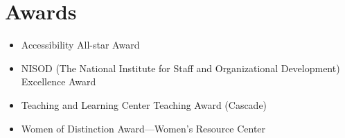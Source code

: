 \section*{Awards}

\begin{itemize}
\item Accessibility All-star Award
\item NISOD (The National Institute for Staff and Organizational Development) Excellence Award
\item Teaching and Learning Center Teaching Award (Cascade)
\item Women of Distinction Award---Women's Resource Center
\end{itemize}
